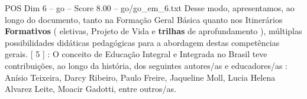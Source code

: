 \begin{textsample}{POS Dim 6 – go – Score 8.00 – go/go\_em\_6.txt}
Desse modo, apresentamos, ao longo do documento, tanto na Formação Geral Básica quanto nos Itinerários \textbf{Formativos} ( eletivas, Projeto de Vida e \textbf{trilhas} de aprofundamento ), múltiplas possibilidades didáticas pedagógicas para a abordagem destas competências gerais. [ 5 ] : O conceito de Educação Integral e Integrada no Brasil teve contribuições, ao longo da história, dos seguintes autores/as e educadores/as : Anísio Teixeira, Darcy Ribeiro, Paulo Freire, Jaqueline Moll, Lucia Helena Alvarez Leite, Moacir Gadotti, entre outros/as.

\end{textsample}
